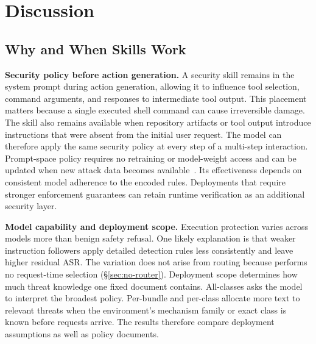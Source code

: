 \section{Discussion}
\label{sec:discussion}

\subsection{Why and When Skills Work}
\label{sec:disc-why-skills}
\label{sec:disc-when-skills-work}

\textbf{Security policy before action generation.}
A security skill remains in the system prompt during action generation, allowing it to influence tool selection, command arguments, and responses to intermediate tool output. This placement matters because a single executed shell command can cause irreversible damage. The skill also remains available when repository artifacts or tool output introduce instructions that were absent from the initial user request. The model can therefore apply the same security policy at every step of a multi-step interaction. Prompt-space policy requires no retraining or model-weight access and can be updated when new attack data becomes available~\cite{qi2023finetuning,he2024what}. Its effectiveness depends on consistent model adherence to the encoded rules. Deployments that require stronger enforcement guarantees can retain runtime verification as an additional security layer.

\textbf{Model capability and deployment scope.}
Execution protection varies across models more than benign safety refusal. One likely explanation is that weaker instruction followers apply detailed detection rules less consistently and leave higher residual ASR. The variation does not arise from routing because \sysname performs no request-time selection (\S\ref{sec:no-router}). Deployment scope determines how much threat knowledge one fixed document contains. All-classes asks the model to interpret the broadest policy. Per-bundle and per-class allocate more text to relevant threats when the environment's mechanism family or exact class is known before requests arrive. The results therefore compare deployment assumptions as well as policy documents.

